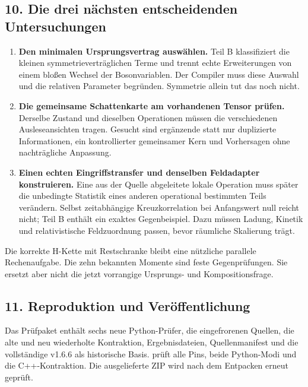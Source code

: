 \subsection{10. Die drei nächsten entscheidenden
Untersuchungen}\label{die-drei-nuxe4chsten-entscheidenden-untersuchungen}

\begin{enumerate}
\def\labelenumi{\arabic{enumi}.}
\tightlist
\item
  \textbf{Den minimalen Ursprungsvertrag auswählen.} Teil B
  klassifiziert die kleinen symmetrieverträglichen Terme und trennt
  echte Erweiterungen von einem bloßen Wechsel der Bosonvariablen. Der
  Compiler muss diese Auswahl und die relativen Parameter begründen.
  Symmetrie allein tut das noch nicht.
\item
  \textbf{Die gemeinsame Schattenkarte am vorhandenen Tensor prüfen.}
  Derselbe Zustand und dieselben Operationen müssen die verschiedenen
  Ausleseansichten tragen. Gesucht sind ergänzende statt nur duplizierte
  Informationen, ein kontrollierter gemeinsamer Kern und Vorhersagen
  ohne nachträgliche Anpassung.
\item
  \textbf{Einen echten Eingriffstransfer und denselben Feldadapter
  konstruieren.} Eine aus der Quelle abgeleitete lokale Operation muss
  später die unbedingte Statistik eines anderen operational bestimmten
  Teils verändern. Selbst zeitabhängige Kreuzkorrelation bei Anfangswert
  null reicht nicht; Teil B enthält ein exaktes Gegenbeispiel. Dazu
  müssen Ladung, Kinetik und relativistische Feldzuordnung passen, bevor
  räumliche Skalierung trägt.
\end{enumerate}

Die korrekte H-Kette mit Restschranke bleibt eine nützliche parallele
Rechenaufgabe. Die zehn bekannten Momente sind feste Gegenprüfungen. Sie
ersetzt aber nicht die jetzt vorrangige Ursprungs- und
Kompositionsfrage.

\subsection{11. Reproduktion und
Veröffentlichung}\label{reproduktion-und-veruxf6ffentlichung}

Das Prüfpaket enthält sechs neue Python-Prüfer, die eingefrorenen
Quellen, die alte und neu wiederholte Kontraktion, Ergebnisdateien,
Quellenmanifest und die vollständige v1.6.6 als historische Basis.
 prüft alle Pins, beide Python-Modi und die
C++-Kontraktion. Die ausgelieferte ZIP wird nach dem Entpacken erneut
geprüft.

